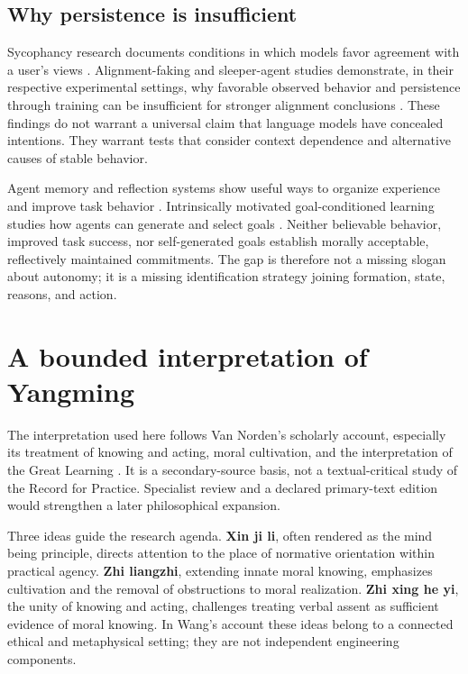 \documentclass[11pt]{article}
\begin{document}
\subsection{Why persistence is insufficient}

Sycophancy research documents conditions in which models favor agreement with a user's views \cite{Sharma2023}. Alignment-faking and sleeper-agent studies demonstrate, in their respective experimental settings, why favorable observed behavior and persistence through training can be insufficient for stronger alignment conclusions \cite{Greenblatt2024,Hubinger2024}. These findings do not warrant a universal claim that language models have concealed intentions. They warrant tests that consider context dependence and alternative causes of stable behavior.

Agent memory and reflection systems show useful ways to organize experience and improve task behavior \cite{Park2023,Shinn2023}. Intrinsically motivated goal-conditioned learning studies how agents can generate and select goals \cite{Colas2020}. Neither believable behavior, improved task success, nor self-generated goals establish morally acceptable, reflectively maintained commitments. The gap is therefore not a missing slogan about autonomy; it is a missing identification strategy joining formation, state, reasons, and action.

\section{A bounded interpretation of Yangming}

The interpretation used here follows Van Norden's scholarly account, especially its treatment of knowing and acting, moral cultivation, and the interpretation of the Great Learning \cite{WangSEP}. It is a secondary-source basis, not a textual-critical study of the Record for Practice. Specialist review and a declared primary-text edition would strengthen a later philosophical expansion.

Three ideas guide the research agenda. \textbf{Xin ji li}, often rendered as the mind being principle, directs attention to the place of normative orientation within practical agency. \textbf{Zhi liangzhi}, extending innate moral knowing, emphasizes cultivation and the removal of obstructions to moral realization. \textbf{Zhi xing he yi}, the unity of knowing and acting, challenges treating verbal assent as sufficient evidence of moral knowing. In Wang's account these ideas belong to a connected ethical and metaphysical setting; they are not independent engineering components.
\end{document}
